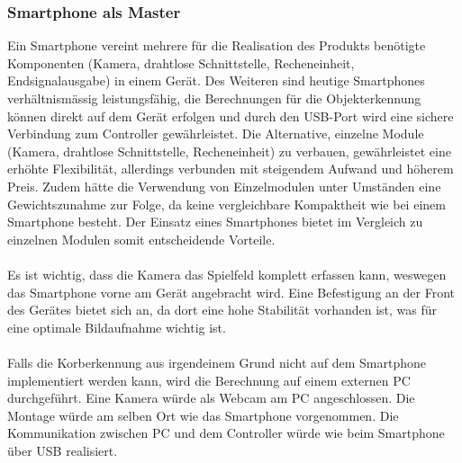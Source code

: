 \subsubsection{Smartphone als Master}
	Ein Smartphone vereint mehrere für die Realisation des Produkts benötigte Komponenten (Kamera, drahtlose Schnittstelle, Recheneinheit, Endsignalausgabe) 
	in einem Gerät. Des Weiteren sind heutige Smartphones verhältnismässig leistungsfähig, die Berechnungen für die Objekterkennung 
	können direkt auf dem Gerät erfolgen und durch den USB-Port wird eine sichere Verbindung zum Controller gewährleistet. Die Alternative, einzelne Module (Kamera, drahtlose Schnittstelle, Recheneinheit) zu verbauen, 
	gewährleistet eine erhöhte Flexibilität, allerdings verbunden mit steigendem Aufwand und höherem Preis. 
	Zudem hätte die Verwendung von Einzelmodulen unter Umständen eine Gewichtszunahme zur Folge, da keine vergleichbare Kompaktheit wie bei einem Smartphone besteht. 
	Der Einsatz eines Smartphones bietet im Vergleich zu einzelnen Modulen somit entscheidende Vorteile.\\
	\\
	Es ist wichtig, dass die Kamera das Spielfeld komplett erfassen kann, weswegen das Smartphone vorne am Gerät angebracht wird. 
	Eine Befestigung an der Front des Gerätes bietet sich an, da dort eine hohe Stabilität vorhanden ist, 
	was für eine optimale Bildaufnahme wichtig ist.\\
	\\
	Falls die Korberkennung aus irgendeinem Grund nicht auf dem Smartphone implementiert werden kann, 
	wird die Berechnung auf einem externen PC durchgeführt. Eine Kamera würde als Webcam am PC 
	angeschlossen. Die Montage würde am selben Ort wie das Smartphone vorgenommen. Die Kommunikation 
	zwischen PC und dem Controller würde wie beim Smartphone über USB realisiert.
